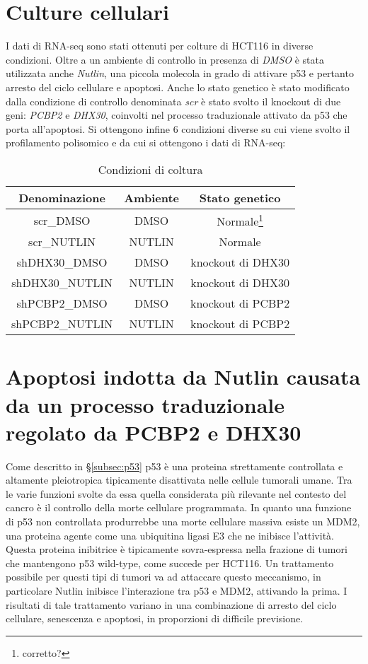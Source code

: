 \section{Culture cellulari}
I dati di RNA-seq sono stati ottenuti per colture di HCT116 in diverse condizioni.
Oltre a un ambiente di controllo in presenza di \emph{DMSO} \`e stata utilizzata anche \emph{Nutlin}, una piccola molecola in grado di attivare p53 e pertanto arresto del ciclo cellulare e apoptosi.
Anche lo stato genetico \`e stato modificato dalla condizione di controllo denominata \emph{scr} \`e stato svolto il knockout di due geni: \emph{PCBP2} e \emph{DHX30}, coinvolti nel processo traduzionale attivato da p53 che porta all'apoptosi.
Si ottengono infine $6$ condizioni diverse su cui viene svolto il profilamento polisomico e da cui si ottengono i dati di RNA-seq:
\begin{table}[H]
  \begin{tabular}{|c|c|c|}
    \hline
    Denominazione & Ambiente & Stato genetico\\
    \hline
    scr\_DMSO & DMSO & Normale\footnote{corretto?}\\
    \hline
    scr\_NUTLIN & NUTLIN & Normale\\
    \hline
    shDHX30\_DMSO & DMSO & knockout di DHX30\\
    \hline
    shDHX30\_NUTLIN & NUTLIN & knockout di DHX30\\
    \hline
    shPCBP2\_DMSO & DMSO & knockout di PCBP2\\
    \hline
    shPCBP2\_NUTLIN & NUTLIN & knockout di PCBP2\\
    \hline
  \end{tabular}
  \centering
  \caption{Condizioni di coltura}
\end{table}

\section{Apoptosi indotta da Nutlin causata da un processo traduzionale regolato da PCBP2 e DHX30}
Come descritto in \S\ref{subsec:p53} p53 \`e una proteina strettamente controllata e altamente pleiotropica tipicamente disattivata nelle cellule tumorali umane.
Tra le varie funzioni svolte da essa quella considerata pi\`u rilevante nel contesto del cancro \`e il controllo della morte cellulare programmata.
In quanto una funzione di p53 non controllata produrrebbe una morte cellulare massiva esiste un MDM2, una proteina agente come una ubiquitina ligasi E3 che ne inibisce l'attivit\`a.
Questa proteina inibitrice \`e tipicamente sovra-espressa nella frazione di tumori che mantengono p53 wild-type, come succede per HCT116.
Un trattamento possibile per questi tipi di tumori va ad attaccare questo meccanismo, in particolare Nutlin inibisce l'interazione tra p53 e MDM2, attivando la prima.
I risultati di tale trattamento variano in una combinazione di arresto del ciclo cellulare, senescenza e apoptosi, in proporzioni di difficile previsione.





